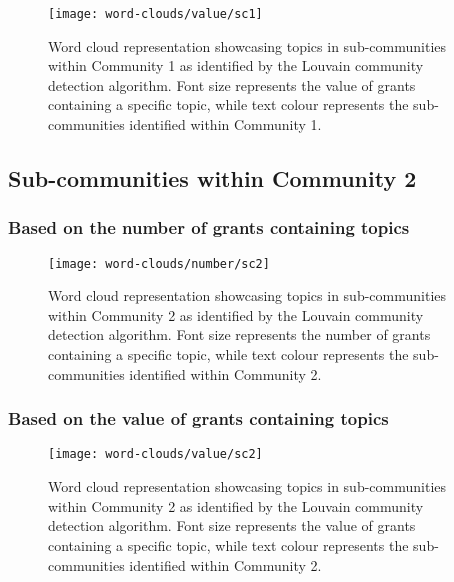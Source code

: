 \begin{figure}[htbp]
    \centering
    \texttt{[image: word-clouds/value/sc1]}
    \caption[Word cloud representation based on the value of grants containing topics in sub-communities within Community 1]{Word cloud representation showcasing topics in sub-communities within Community 1 as identified by the Louvain community detection algorithm. Font size represents the value of grants containing a specific topic, while text colour represents the sub-communities identified within Community 1.}
    \label{fig:topic_grant_value_sc1}
\end{figure}

\subsection{Sub-communities within Community 2}

\subsubsection{Based on the number of grants containing topics}

\begin{figure}[htbp]
    \centering
    \texttt{[image: word-clouds/number/sc2]}
    \caption[Word cloud representation based on the number of grants containing topics in sub-communities within Community 2]{Word cloud representation showcasing topics in sub-communities within Community 2 as identified by the Louvain community detection algorithm. Font size represents the number of grants containing a specific topic, while text colour represents the sub-communities identified within Community 2.}
    \label{fig:topic_grant_number_sc2}
\end{figure}

\clearpage

\subsubsection{Based on the value of grants containing topics}

\begin{figure}[htbp]
    \centering
    \texttt{[image: word-clouds/value/sc2]}
    \caption[Word cloud representation based on the value of grants containing topics in sub-communities within Community 2]{Word cloud representation showcasing topics in sub-communities within Community 2 as identified by the Louvain community detection algorithm. Font size represents the value of grants containing a specific topic, while text colour represents the sub-communities identified within Community 2.}
    \label{fig:topic_grant_value_sc2}
\end{figure}

